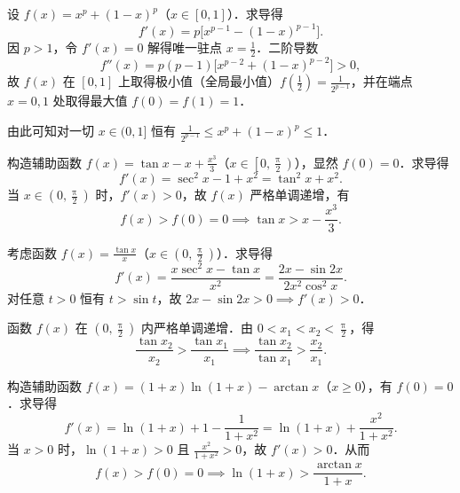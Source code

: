 \begin{myproof}

    设 $f(x) = x^p + (1-x)^p$（$x \in [0, 1]$）．求导得
    \begin{equation}
        f'(x) = p\bigl[ x^{p-1} - (1-x)^{p-1} \bigr].
    \end{equation}
    因 $p > 1$，令 $f'(x) = 0$ 解得唯一驻点 $x = \frac{1}{2}$．二阶导数
    \begin{equation}
        f''(x) = p(p-1)\bigl[ x^{p-2} + (1-x)^{p-2} \bigr] > 0,
    \end{equation}
    故 $f(x)$ 在 $[0, 1]$ 上取得极小值（全局最小值）$f\left(\frac{1}{2}\right) = \frac{1}{2^{p-1}}$，并在端点 $x = 0, 1$ 处取得最大值 $f(0) = f(1) = 1$．

    由此可知对一切 $x \in (0, 1]$ 恒有 $\frac{1}{2^{p-1}} \leqslant x^p + (1-x)^p \leqslant 1$．


    构造辅助函数 $f(x) = \tan x - x + \frac{x^3}{3}$（$x \in \left[0, \frac{\uppi}{2}\right)$），显然 $f(0) = 0$．求导得
    \begin{equation}
        f'(x) = \sec^2 x - 1 + x^2 = \tan^2 x + x^2.
    \end{equation}
    当 $x \in \left(0, \frac{\uppi}{2}\right)$ 时，$f'(x) > 0$，故 $f(x)$ 严格单调递增，有
    \begin{equation}
        f(x) > f(0) = 0 \implies \tan x > x - \frac{x^3}{3}.
    \end{equation}


    考虑函数 $f(x) = \frac{\tan x}{x}$（$x \in \left(0, \frac{\uppi}{2}\right)$）．求导得
    \begin{equation}
        f'(x) = \frac{x\sec^2 x - \tan x}{x^2} = \frac{2x - \sin 2x}{2x^2 \cos^2 x}.
    \end{equation}
    对任意 $t > 0$ 恒有 $t > \sin t$，故 $2x - \sin 2x > 0 \implies f'(x) > 0$．

    函数 $f(x)$ 在 $\left(0, \frac{\uppi}{2}\right)$ 内严格单调递增．由 $0 < x_1 < x_2 < \frac{\uppi}{2}$，得
    \begin{equation}
        \frac{\tan x_2}{x_2} > \frac{\tan x_1}{x_1} \implies \frac{\tan x_2}{\tan x_1} > \frac{x_2}{x_1}.
    \end{equation}


    构造辅助函数 $f(x) = (1+x)\ln(1+x) - \arctan x$（$x \geqslant 0$），有 $f(0) = 0$．求导得
    \begin{equation}
        f'(x) = \ln(1+x) + 1 - \frac{1}{1+x^2} = \ln(1+x) + \frac{x^2}{1+x^2}.
    \end{equation}
    当 $x > 0$ 时，$\ln(1+x) > 0$ 且 $\frac{x^2}{1+x^2} > 0$，故 $f'(x) > 0$．从而
    \begin{equation}
        f(x) > f(0) = 0 \implies \ln(1+x) > \frac{\arctan x}{1+x}.
    \end{equation}


\end{myproof}
